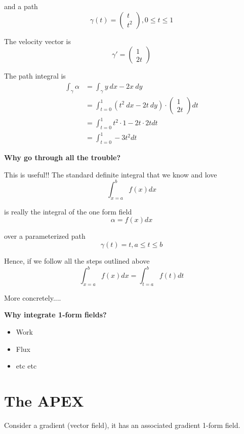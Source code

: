 and a path
\[
  \gamma(t) = \begin{pmatrix} t \\ t^2 \end{pmatrix} , 0 \leq t \leq 1
\]  

The velocity vector is 
\[
  \gamma ' = \begin{pmatrix} 1 \\ 2t \end{pmatrix} 
\] 

The path integral is 
\begin{align*}
   \int_{\gamma} \alpha &=  \int_{\gamma} y\ dx - 2x\ dy \\
                        &= \int_{t=0}^{1} \left( t^2\ dx - 2t\ dy \right) \cdot \begin{pmatrix} 1 \\ 2t \end{pmatrix}  dt \\
                        &= \int_{t=0}^{1}  t^2 \cdot 1 - 2t \cdot 2t dt \\
                        &= \int_{t=0}^{1}  -3t^2 dt  
\end{align*}

\textbf{Why go through all the trouble?}

This is useful!! The standard definite integral that we know and love
\[
  \int_{x=a}^{b}  f(x) dx 
\] 

is really the integral of the one form field \[
  \alpha = f(x) dx
\] 

over a parameterized path
\[
  \gamma(t) = t, a \leq t \leq b
\] 

Hence, if we follow all the steps outlined above
\[
  \int_{x=a}^{b}  f(x) dx = \int_{t=a}^{b} f(t) dt  
\] 

More concretely....

\textbf{Why integrate 1-form fields?}
\begin{itemize}
   \item Work
   \item Flux
   \item etc etc
\end{itemize}

\section{The APEX}

Consider a gradient (vector field), it has an associated gradient 1-form field. \\


